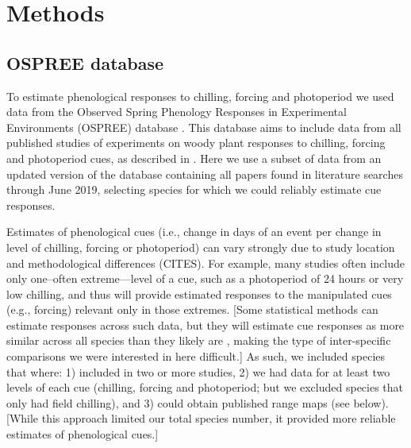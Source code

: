 \documentclass[12pt]{article}\usepackage[]{graphicx}\usepackage[]{color}
\begin{document}
\section*{Methods}
\subsection*{OSPREE database}
To estimate phenological responses to chilling, forcing and photoperiod we used data from the Observed Spring Phenology Responses in Experimental Environments (OSPREE) database  \citep{wolkovich2019}. This database aims to include data from all published studies of experiments on woody plant responses to chilling, forcing and photoperiod cues, as described in \citet{Ettinger:2020aa}. Here we use a subset of data from an updated version of the database containing all papers found in literature searches through June 2019, selecting species for which we could reliably estimate cue responses. 

Estimates of phenological cues (i.e., change in days of an event per change in level of chilling, forcing or photoperiod) can vary strongly due to study location and methodological differences (CITES). For example, many studies often include only one--often extreme---level of a cue, such as a photoperiod of 24 hours or very low chilling, and thus will provide estimated responses to the manipulated cues (e.g., forcing) relevant only in those extremes. [Some statistical methods can estimate responses across such data, but they will estimate cue responses as more similar across all species than they likely are \citep[see][for example]{Ettinger:2020aa}, making the type of inter-specific comparisons we were interested in here difficult.] As such, we included species that where: 1) included in two or more studies, 2) we had data for at least two levels of each cue (chilling, forcing and photoperiod; but we excluded species that only had field chilling), and 3) could obtain published range maps (see below). [While this approach limited our total species number, it provided more reliable estimates of phenological cues.]
\end{document}
